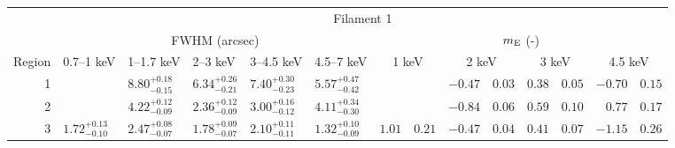 \begin{tabular}{@{}rlllllr@{ $\pm$ }lr@{ $\pm$ }lr@{ $\pm$ }lr@{ $\pm$ }l@{}}
\toprule
{} & \multicolumn{13}{c}{Filament 1} \\
\cmidrule(l){2-14}
{} & \multicolumn{5}{c}{FWHM (arcsec)} & \multicolumn{8}{c}{$m_\mathrm{E}$ (-)} \\
\cmidrule(lr){2-6} \cmidrule(l){7-14}
Region & 0.7--1 keV & 1--1.7 keV & 2--3 keV & 3--4.5 keV & 4.5--7 keV
       & \multicolumn{2}{c}{1 keV} & \multicolumn{2}{c}{2 keV}
       & \multicolumn{2}{c}{3 keV} & \multicolumn{2}{c}{4.5 keV} \\
\cmidrule{1-14}
1 & {} & ${8.80}^{+0.18}_{-0.15}$ & ${6.34}^{+0.26}_{-0.21}$ & ${7.40}^{+0.30}_{-0.23}$ & ${5.57}^{+0.47}_{-0.42}$
  & \multicolumn{2}{c}{} & $-0.47$ & $0.03$ & $0.38$ & $0.05$ & $-0.70$ & $0.15$ \\
2 & {} & ${4.22}^{+0.12}_{-0.09}$ & ${2.36}^{+0.12}_{-0.09}$ & ${3.00}^{+0.16}_{-0.12}$ & ${4.11}^{+0.34}_{-0.30}$
  & \multicolumn{2}{c}{} & $-0.84$ & $0.06$ & $0.59$ & $0.10$ & $0.77$ & $0.17$ \\
3 & ${1.72}^{+0.13}_{-0.10}$ & ${2.47}^{+0.08}_{-0.07}$ & ${1.78}^{+0.09}_{-0.07}$ & ${2.10}^{+0.11}_{-0.11}$ & ${1.32}^{+0.10}_{-0.09}$
  & $1.01$ & $0.21$ & $-0.47$ & $0.04$ & $0.41$ & $0.07$ & $-1.15$ & $0.26$ \\


\end{tabular}
